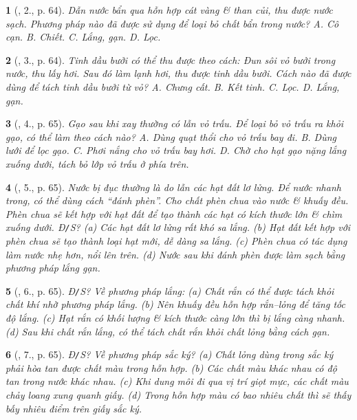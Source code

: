 \documentclass{article}
\newtheorem{baitoan}{}
\begin{document}
\begin{baitoan}[\cite{ncpt_KHTN_6_tap_1}, 2., p. 64]
	Dẫn nước bẩn qua hỗn hợp cát vàng \& than củi, thu được nước sạch. Phương pháp nào đã được sử dụng để loại bỏ chất bẩn trong nước? {\sf A.} Cô cạn. {\sf B.} Chiết. {\sf C.} Lắng, gạn. {\sf D.} Lọc.
\end{baitoan}

\begin{baitoan}[\cite{ncpt_KHTN_6_tap_1}, 3., p. 64]
	Tinh dầu bưởi có thể thu được theo cách: Đun sôi vỏ bưởi trong nước, thu lấy hơi. Sau đó làm lạnh hơi, thu được tinh dầu bưởi. Cách nào đã được dùng để tách tinh dầu bưởi từ vỏ? {\sf A.} Chưng cất. {\sf B.} Kết tinh. {\sf C.} Lọc. {\sf D.} Lắng, gạn.
\end{baitoan}

\begin{baitoan}[\cite{ncpt_KHTN_6_tap_1}, 4., p. 65]
	Gạo sau khi xay thường có lẫn vỏ trấu. Để loại bỏ vỏ trấu ra khỏi gạo, có thể làm theo cách nào? {\sf A.} Dùng quạt thổi cho vỏ trấu bay đi. {\sf B.} Dùng lưới để lọc gạo. {\sf C.} Phơi nắng cho vỏ trấu bay hơi. {\sf D.} Chờ cho hạt gạo nặng lắng xuống dưới, tách bỏ lớp vỏ trấu ở phía trên.
\end{baitoan}

\begin{baitoan}[\cite{ncpt_KHTN_6_tap_1}, 5., p. 65]
	Nước bị đục thường là do lẫn các hạt đất lơ lửng. Để nước nhanh trong, có thể dùng cách ``đánh phèn''. Cho chất phèn chua vào nước \& khuấy đều. Phèn chua sẽ kết hợp với hạt đất để tạo thành các hạt có kích thước lớn \& chìm xuống dưới. {\rm Đ{\tt/}S?} (a) Các hạt đất lơ lửng rất khó sa lắng. (b) Hạt đất kết hợp với phèn chua sẽ tạo thành loại hạt mới, dễ dàng sa lắng. (c) Phèn chua có tác dụng làm nước nhẹ hơn, nổi lên trên. (d) Nước sau khi đánh phèn được làm sạch bằng phương pháp lắng gạn.
\end{baitoan}

\begin{baitoan}[\cite{ncpt_KHTN_6_tap_1}, 6., p. 65]
	{\rm Đ{\tt/}S?} Về phương pháp lắng: (a) Chất rắn có thể được tách khỏi chất khí nhờ phương pháp lắng. (b) Nên khuấy đều hỗn hợp rắn--lỏng để tăng tốc độ lắng. (c) Hạt rắn có khối lượng \& kích thước càng lớn thì bị lắng càng nhanh. (d) Sau khi chất rắn lắng, có thể tách chất rắn khỏi chất lỏng bằng cách gạn.
\end{baitoan}

\begin{baitoan}[\cite{ncpt_KHTN_6_tap_1}, 7., p. 65]
	{\rm Đ{\tt/}S?} Về phương pháp sắc ký? (a) Chất lỏng dùng trong sắc ký phải hòa tan được chất màu trong hỗn hợp. (b) Các chất màu khác nhau có độ tan trong nước khác nhau. (c) Khi dung môi đi qua vị trí giọt mực, các chất màu chảy loang xung quanh giấy. (d) Trong hỗn hợp màu có bao nhiêu chất thì sẽ thấy bấy nhiêu điểm trên giấy sắc ký.
\end{baitoan}
\end{document}
